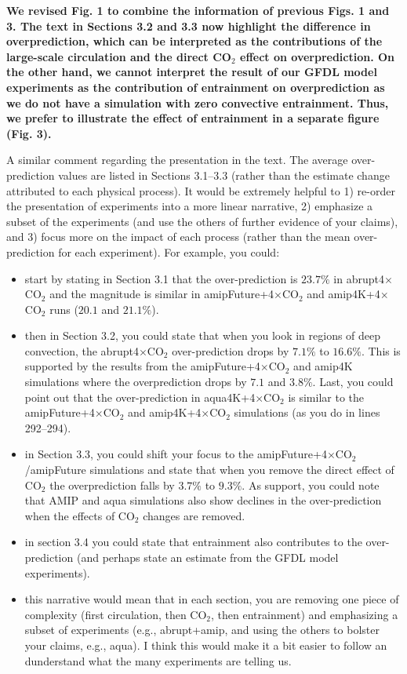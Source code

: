 \documentclass[11pt]{article}
\begin{document}
\textbf{We revised Fig. 1 to combine the information of previous Figs. 1 and 3. The text in Sections 3.2 and 3.3 now highlight the difference in overprediction, which can be interpreted as the contributions of the large-scale circulation and the direct CO$_2$ effect on overprediction. On the other hand, we cannot interpret the result of our GFDL model experiments as the contribution of entrainment on overprediction as we do not have a simulation with zero convective entrainment. Thus, we prefer to illustrate the effect of entrainment in a separate figure (Fig. 3).}

A similar comment regarding the presentation in the text. The average over-prediction values are listed in Sections 3.1--3.3 (rather than the estimate change attributed to each physical process). It would be extremely helpful to 1) re-order the presentation of experiments into a more linear narrative, 2) emphasize a subset of the experiments (and use the others of further evidence of your claims), and 3) focus more on the impact of each process (rather than the mean over-prediction for each experiment). For example, you could:
\begin{itemize}
\item start by stating in Section 3.1 that the over-prediction is \(23.7\%\) in abrupt4\(\times\)CO\(_2\) and the magnitude is similar in amipFuture+4\(\times\)CO\(_2\) and amip4K+4\(\times\)CO\(_2\) runs (\(20.1\) and \(21.1\%\)).
\item then in Section 3.2, you could state that when you look in regions of deep convection, the abrupt4\(\times\)CO\(_2\) over-prediction drops by \(7.1\%\) to \(16.6\%\). This is supported by the results from the amipFuture+4\(\times\)CO\(_2\) and amip4K simulations where the overprediction drops by \(7.1\) and \(3.8\%\). Last, you could point out that the over-prediction in aqua4K+4\(\times\)CO\(_2\) is similar to the amipFuture+4\(\times\)CO\(_2\) and amip4K+4\(\times\)CO\(_2\) simulations (as you do in lines 292--294).
\item in Section 3.3, you could shift your focus to the amipFuture+4\(\times\)CO\(_2\)/amipFuture simulations and state that when you remove the direct effect of CO\(_2\) the overprediction falls by \(3.7\%\) to \(9.3\%\). As support, you could note that AMIP and aqua simulations also show declines in the over-prediction when the effects of CO\(_2\) changes are removed.
\item in section 3.4 you could state that entrainment also contributes to the over-prediction (and perhaps state an estimate from the GFDL model experiments).
\item this narrative would mean that in each section, you are removing one piece of complexity (first circulation, then CO\(_2\), then entrainment) and emphasizing a subset of experiments (e.g., abrupt+amip, and using the others to bolster your claims, e.g., aqua). I think this would make it a bit easier to follow an dunderstand what the many experiments are telling us.
\end{itemize}
\end{document}
